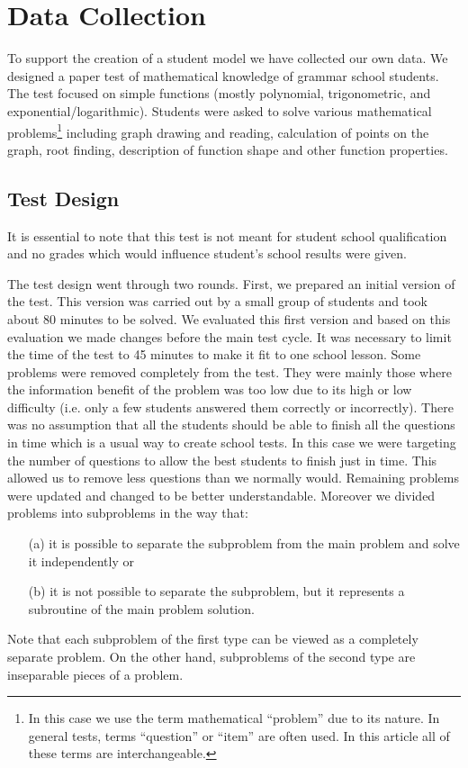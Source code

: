 \chapter{Data Collection}

To support the creation of a student model we have collected our own data. We designed a paper test of mathematical knowledge of grammar school students. The test focused on simple functions (mostly polynomial, trigonometric, and exponential/logarithmic). Students were asked to solve various mathematical problems\footnote{In this case we use the term mathematical ``problem'' due to its nature. In general tests,	 terms ``question'' or ``item'' are often used. In this article all of these terms are interchangeable.} including graph drawing and reading, calculation of points on the graph, root finding, description of function shape and other function properties. 

\section{Test Design}
It is essential to note that this test is not meant for student school qualification and no grades which would influence student's school results were given.

The test design went through two rounds. First, we prepared an initial version of the test. This version was carried out by a small group of students and took about 80 minutes to be solved. We evaluated this first version and based on this evaluation we made changes before the main test cycle. It was necessary to limit the time of the test to 45 minutes to make it fit to one school lesson. Some problems were removed completely from the test. They were mainly those where the information benefit of the problem was too low due to its high or low difficulty (i.e. only a few students answered them correctly or incorrectly). There was no assumption that all the students should be able to finish all the questions in time which is a usual way to create school tests. In this case we were targeting the number of questions to allow the best students to finish just in time. This allowed us to remove less questions than we normally would. Remaining problems were updated and changed to be better understandable.  Moreover we divided problems into subproblems in the way that: 
\begin{itemize}
\item[(a)] it is possible to separate the subproblem from the main problem and solve it independently or 
\item[(b)] it is not possible to separate the subproblem, but it represents a subroutine of the main problem solution. 
\end{itemize}
Note that each subproblem of the first type can be viewed as a completely separate problem. 
On the other hand, subproblems of the second type are inseparable pieces of a problem.\\

